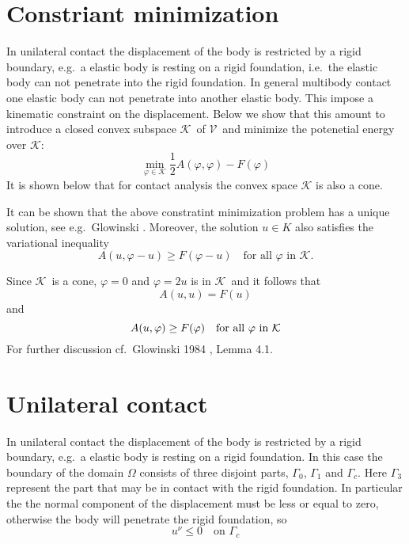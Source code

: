 \documentclass[12pt,a4paper]{article}
\numberwithin{equation}{section}
\numberwithin{table}{section}
\numberwithin{figure}{section}
\newcommand{\V}{\ensuremath{\mathcal{V}}}
\newcommand{\K}{\ensuremath{\mathcal{K}}}
\renewcommand{\phi}{\varphi}
\begin{document}
\section{Constriant minimization}

In unilateral contact the displacement of the body is restricted by a rigid boundary, e.g.\ a elastic body is resting on a rigid foundation, i.e.\ the elastic body can not penetrate into the rigid foundation. In general multibody contact one elastic body can not penetrate into another elastic body. This impose a kinematic constraint on the displacement. Below we show that this amount to introduce a closed convex subspace $\K$\ of $\V$\ and minimize the potenetial energy over $\K$:
\begin{equation}
  \label{ineq:potential_convex}
  \min_{\phi\in\K} \frac{1}{2}A(\phi,\phi) - F(\phi)
\end{equation}
It is shown below that for contact analysis the convex space $\K$ is also a cone.

It can be shown that the above constratint minimization problem has a unique solution, see e.g.\ Glowinski \cite{Glowinski1984:NonlinearVariational}. Moreover, the solution $u \in K$ also satisfies the variational inequality
\begin{equation}
  \label{ineq:varIneq}
  A(u,\phi-u) \ge F(\phi-u) \quad\text{for all $\phi$ in $\K$.}
\end{equation}

Since \K\ is a cone, $\phi = 0$ and $\phi = 2 u$ is in \K\ and it follows that
\begin{equation}
  \label{eq:varIneqSol}
  A(u,u) = F(u)
\end{equation}
and
\begin{equation}
  \label{ineq:varIneqSol}
  A(u,\phi) \ge F(\phi) \quad\text{for all $\phi$ in \K}
\end{equation}
For further discussion cf.\ Glowinski 1984 \cite{Glowinski1984:NonlinearVariational}, Lemma 4.1.

\section{Unilateral contact}

In unilateral contact the displacement of the body is restricted by a rigid boundary, e.g.\ a elastic body is resting on a rigid foundation.  In this case the boundary of the domain $\Omega$ consists of three disjoint parts, $\Gamma_0$, $\Gamma_1$ and $\Gamma_c$. Here $\Gamma_3$ represent the part that may be in contact with the rigid foundation. In particular the the normal component of the displacement must be less or equal to zero, otherwise the body will penetrate the rigid foundation, so
\begin{equation}
  u^\nu \le 0 \quad\text{on $\Gamma_c$}
\end{equation}
\end{document}

